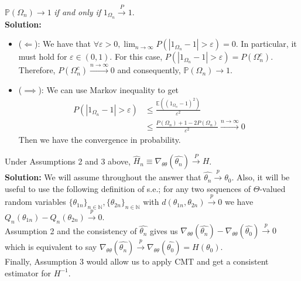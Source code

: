 \documentclass[11pt,letterpaper]{article}                  %
\begin{document}
\begin{problem}
$\mathbb{P}(\Omega_n)\rightarrow 1$ \textit{if and only if} $1_{\Omega_n} \overset{P}{\rightarrow}1$.\\

\textbf{Solution:}
\begin{itemize}
\item{($\Longleftarrow$)}: We have that $\forall \varepsilon>0, \lim_{n\to\infty} P(|1_{\Omega_n}-1|>\varepsilon)=0$. In particular, it must hold for $\varepsilon \in (0,1)$. For this case, $P(|1_{\Omega_n}-1|>\varepsilon)=P(\Omega_n^c)$. Therefore, $P(\Omega_n^c) \overset{n \to\infty}{\longrightarrow} 0$ and consequently, $\mathbb{P}(\Omega_n)\rightarrow 1$.

\item{($\implies$)}: We can use Markov inequality to get
\begin{align*}
P(|1_{\Omega_n}-1|>\varepsilon)&\leq \frac{\mathbb{E}((1_{\Omega_n}-1)^2)}{\varepsilon^2}\\
&\leq \frac{P(\Omega_n)+1-2P(\Omega_n)}{\varepsilon^2} \overset{n\to\infty}{\longrightarrow}0
\end{align*}
Then we have the convergence in probability.
\end{itemize}
\end{problem}

\bigskip
\begin{problem}
\end{problem}

\bigskip
\begin{problem}
\end{problem}

\bigskip
\begin{problem}
Under Assumptions 2 and 3 above, $\hat{H}_n \equiv \nabla_{\theta\theta}(\widehat{\theta_n}) \overset{P}{\rightarrow} H$.\\

\textbf{Solution:} We will assume throughout the answer that $\widehat{\theta_n}\overset{p}{\rightarrow}\theta_0$. Also, it will be useful to use the following definition of s.e.; for any two sequences of $\Theta$-valued random variables $\{\theta_{1n}\}_{n\in\mathbb{N}}, \{\theta_{2n}\}_{n\in\mathbb{N}}$ with $d(\theta_{1n},\theta_{2n})\overset{p}{\rightarrow}0$ we have $Q_n(\theta_{1n}) - Q_n(\theta_{2n})\overset{p}{\rightarrow}0$.\\

Assumption 2 and the consistency of $\widehat{\theta_n}$ gives us $\nabla_{\theta\theta}(\widehat{\theta_n}) - \nabla_{\theta\theta}(\widehat{\theta_0}) \overset{p}{\rightarrow}0$ which is equivalent to say $\nabla_{\theta\theta}(\widehat{\theta_n}) \overset{p}{\rightarrow} \nabla_{\theta\theta}(\widehat{\theta_0}) = H(\theta_0)$.\\

Finally, Assumption 3 would allow us to apply CMT and get a consistent estimator for $H^{-1}$.
\end{problem}
\end{document}
